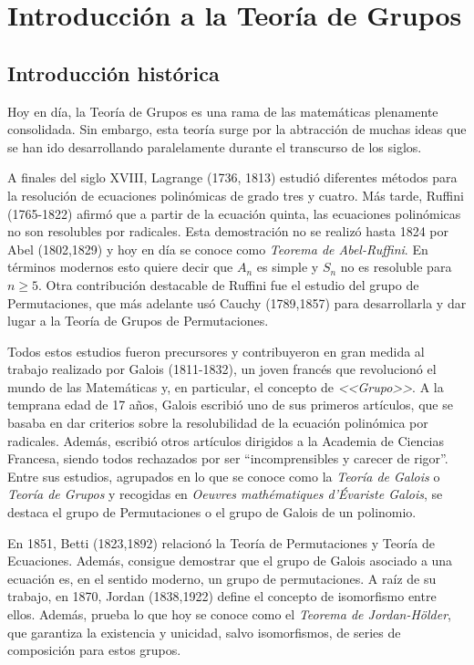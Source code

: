 \chapter{Introducción a la Teoría de Grupos}


\section{Introducción histórica}
Hoy en día, la Teoría de Grupos es una rama de las matemáticas plenamente consolidada. Sin embargo, esta teoría surge por la abtracción de muchas ideas que se han ido desarrollando paralelamente durante el transcurso de los siglos.

A finales del siglo XVIII, Lagrange (1736, 1813) estudió diferentes métodos para la resolución de ecuaciones polinómicas de grado tres y cuatro. Más tarde, Ruffini (1765-1822) afirmó que a partir de la ecuación quinta, las ecuaciones polinómicas no son resolubles por radicales. Esta demostración no se realizó hasta 1824 por Abel (1802,1829) y hoy en día se conoce como \textit{Teorema de Abel-Ruffini}.  En términos modernos esto quiere decir que $A_n$ es simple y  $S_n$ no es resoluble para $n\geq 5$. Otra  contribución destacable de Ruffini fue el estudio del grupo de Permutaciones, que más adelante usó Cauchy (1789,1857) para desarrollarla y dar lugar a la Teoría de Grupos de Permutaciones. 

Todos estos estudios fueron precursores y contribuyeron en gran medida al trabajo realizado por Galois (1811-1832), un joven francés que revolucionó el mundo de las Matemáticas y, en particular, el concepto de \textit{<<Grupo>>}. A la temprana edad de 17 años, Galois escribió uno de sus primeros artículos, que se basaba en dar criterios sobre la resolubilidad de la ecuación polinómica por radicales.  Además, escribió otros artículos dirigidos a la Academia de Ciencias Francesa, siendo todos rechazados por ser ``incomprensibles y carecer de rigor''. Entre sus estudios, agrupados en lo que se conoce como la \textit{Teoría de Galois} o \textit{Teoría de Grupos} y recogidas en \textit{Oeuvres mathématiques d'Évariste Galois}, se destaca el grupo de Permutaciones o el grupo de Galois de un polinomio.


En 1851, Betti (1823,1892) relacionó la Teoría de Permutaciones y Teoría de Ecuaciones. Además, consigue demostrar que el grupo de Galois asociado a una ecuación es, en el sentido moderno, un grupo de permutaciones. A raíz de su trabajo, en 1870, Jordan (1838,1922) define el concepto de isomorfismo entre ellos. Además, prueba lo que hoy se conoce como el \textit{Teorema de Jordan-Hölder}, que garantiza la existencia y unicidad, salvo isomorfismos, de series de composición para estos grupos.


